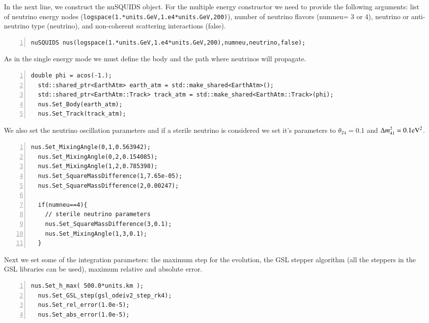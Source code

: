 \documentclass[3p,12pt]{elsarticle}
\newcommand{\ttf}{\ttfamily}
\begin{document}
In the next line, we construct the nuSQUIDS object. For the
multiple energy constructor we need to provide the following arguments:
list of neutrino energy nodes
(\lstinline[columns=fixed,breaklines=true]{logspace(1.*units.GeV,1.e4*units.GeV,200)}),
number of neutrino flavors ({\ttf numneu}= 3 or 4), neutrino or
anti-neutrino type ({\ttf neutrino}), and non-coherent scattering
interactions ({\ttf false}). 
\begin{lstlisting}[frame=leftline, numbers = left,breaklines=true,
  label = ex:sin1,firstnumber=last]
  nuSQUIDS nus(logspace(1.*units.GeV,1.e4*units.GeV,200),numneu,neutrino,false);
\end{lstlisting}

As in the single energy mode we must define the body and the path
where neutrinos will propagate.

\begin{lstlisting}[frame=leftline, numbers = left,breaklines=true,
  label = ex:sin1,firstnumber=last]
  double phi = acos(-1.);
  std::shared_ptr<EarthAtm> earth_atm = std::make_shared<EarthAtm>();
  std::shared_ptr<EarthAtm::Track> track_atm = std::make_shared<EarthAtm::Track>(phi);
  nus.Set_Body(earth_atm);
  nus.Set_Track(track_atm);
\end{lstlisting}

We also set the neutrino oscillation parameters and if a sterile
neutrino is considered we set it's parameters to $\theta_{24}=0.1$ and
$\Delta m_{41}^2=0.1{\rm eV}^2$.
\begin{lstlisting}[frame=leftline, numbers = left,breaklines=true,label = ex:sin1,firstnumber=last]
  nus.Set_MixingAngle(0,1,0.563942);
  nus.Set_MixingAngle(0,2,0.154085);
  nus.Set_MixingAngle(1,2,0.785398);
  nus.Set_SquareMassDifference(1,7.65e-05);
  nus.Set_SquareMassDifference(2,0.00247);

  if(numneu==4){
    // sterile neutrino parameters
    nus.Set_SquareMassDifference(3,0.1);
    nus.Set_MixingAngle(1,3,0.1);
  }
\end{lstlisting}

Next we set some of the integration parameters: the maximum
step for the evolution,  the GSL stepper algorithm (all the steppers in
the GSL libraries can be used), maximum relative and absolute error.

\begin{lstlisting}[frame=leftline, numbers = left,breaklines=true,label = ex:sin1,firstnumber=last]
  nus.Set_h_max( 500.0*units.km );
  nus.Set_GSL_step(gsl_odeiv2_step_rk4);
  nus.Set_rel_error(1.0e-5);
  nus.Set_abs_error(1.0e-5);
\end{lstlisting}
\end{document}
